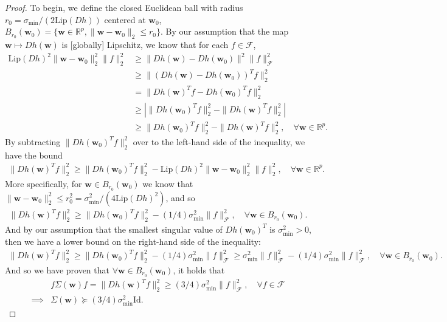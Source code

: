 \documentclass{article}
\begin{document}
\begin{proof}
To begin, we define the closed Euclidean ball with radius $r_0 = \sigma_{\text{min}}/(2\text{Lip}(Dh))$ centered at $\boldsymbol{w}_0$, $B_{r_0}(\boldsymbol{w}_0) = \{ \boldsymbol{w} \in \mathbb{R}^p, \| \boldsymbol{w} - \boldsymbol{w}_0 \|_2 \leq r_0 \}$. By our assumption that the map $\boldsymbol{w} \mapsto Dh(\boldsymbol{w})$ is [globally] Lipschitz, we know that for each $f \in \mathcal{F}$,
\begin{align*}
    \text{Lip}(Dh)^2 \| \boldsymbol{w} - \boldsymbol{w}_0 \|_2^2 \|f \|_2^2 &\geq \|Dh(\boldsymbol{w}) - Dh(\boldsymbol{w}_0)\|^2 \|f\|_{\mathcal{F}}^2\\
    &\geq \|(Dh(\boldsymbol{w}) - Dh(\boldsymbol{w}_0))^Tf\|_2^2\\
    &= \|Dh(\boldsymbol{w})^Tf - Dh(\boldsymbol{w}_0)^Tf\|_2^2\\
    &\geq \left| \|Dh(\boldsymbol{w}_0)^Tf\|_2^2 - \|Dh(\boldsymbol{w})^Tf\|_2^2 \right|\\
    &\geq  \|Dh(\boldsymbol{w}_0)^Tf\|_2^2 - \|Dh(\boldsymbol{w})^Tf\|_2^2, \quad \forall \boldsymbol{w} \in \mathbb{R}^p.
\end{align*}
By subtracting $\|Dh(\boldsymbol{w}_0)^Tf\|_2^2$ over to the left-hand side of the inequality, we have the bound
\begin{align*}
    \|Dh(\boldsymbol{w})^Tf\|_2^2 \geq \|Dh(\boldsymbol{w}_0)^Tf\|_2^2 - \text{Lip}(Dh)^2 \| \boldsymbol{w} - \boldsymbol{w}_0 \|_2^2 \|f \|_2^2, \quad \forall \boldsymbol{w} \in \mathbb{R}^p.
\end{align*}
More specifically, for $\boldsymbol{w} \in B_{r_0}(\boldsymbol{w}_0)$ we know that $\| \boldsymbol{w} - \boldsymbol{w}_0 \|_2^2 \leq r_0^2 = \sigma_{\text{min}}^2/(4\text{Lip}(Dh)^2)$, and so
\begin{align*}
    \|Dh(\boldsymbol{w})^Tf\|_2^2 \geq \|Dh(\boldsymbol{w}_0)^Tf\|_2^2 - (1/4)\sigma_{\text{min}}^2\|f\|_{\mathcal{F}}^2, \quad \forall \boldsymbol{w} \in B_{r_0}(\boldsymbol{w}_0).
\end{align*}
And by our assumption that the smallest singular value of $Dh(\boldsymbol{w}_0)^T$ is $\sigma_{\text{min}}^2 > 0$, then we have a lower bound on the right-hand side of the inequality:
\begin{align*}
   \|Dh(\boldsymbol{w})^Tf\|_2^2 \geq \|Dh(\boldsymbol{w}_0)^Tf\|_2^2 - (1/4)\sigma_{\text{min}}^2\|f\|_{\mathcal{F}}^2 \geq \sigma_{\text{min}}^2 \|f\|_{\mathcal{F}}^2 - (1/4)\sigma_{\text{min}}^2\|f\|_{\mathcal{F}}^2, \quad \forall \boldsymbol{w} \in B_{r_0}(\boldsymbol{w}_0).
\end{align*}
And so we have proven that $\forall \boldsymbol{w} \in B_{r_0}(\boldsymbol{w}_0)$, it holds that
\begin{align*}
&f\Sigma(\boldsymbol{w})f  = \|Dh(\boldsymbol{w})^Tf\|_2^2  \geq (3/4) \sigma_{\text{min}}^2 \|f\|_{\mathcal{F}}^2, \quad \forall f \in \mathcal{F}\\
\implies& \Sigma(\boldsymbol{w}) \succeq (3/4) \sigma_{\text{min}}^2\text{Id}.
\end{align*}


\end{proof}
\end{document}
